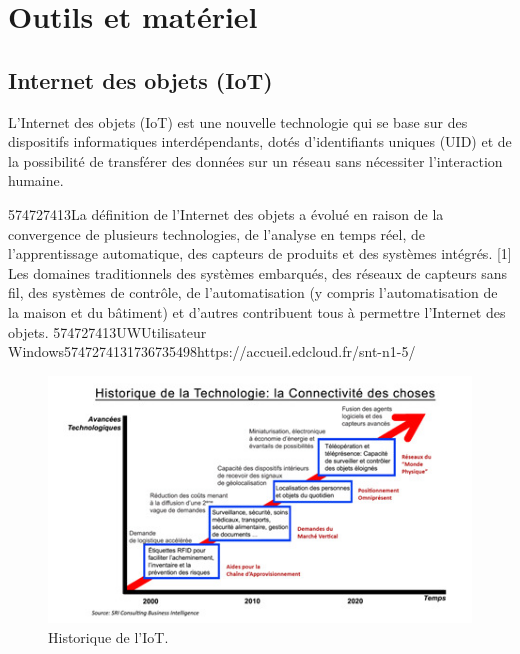 \documentclass[12pt,a4paper]{report}
\begin{document}
\chapter{Outils et matériel}


\noindent \begin{flushleft}
	
	
	\noindent 
	
	\noindent 
	
	\noindent 
	
	\section{Internet des objets (IoT)}
	
	\noindent 
	
	\noindent L'Internet des objets (IoT) est une nouvelle technologie qui se base sur des dispositifs informatiques interd\'{e}pendants, dot\'{e}s d'identifiants uniques (UID) et de la possibilit\'{e} de transf\'{e}rer des donn\'{e}es sur un r\'{e}seau sans n\'{e}cessiter l'interaction humaine.
	
	\noindent 
	
	\noindent 574727413La d\'{e}finition de l'Internet des objets a \'{e}volu\'{e} en raison de la convergence de plusieurs technologies, de l'analyse en temps r\'{e}el, de l'apprentissage automatique, des capteurs de produits et des syst\`{e}mes int\'{e}gr\'{e}s. [1] Les domaines traditionnels des syst\`{e}mes embarqu\'{e}s, des r\'{e}seaux de capteurs sans fil, des syst\`{e}mes de contr\^{o}le, de l'automatisation (y compris l'automatisation de la maison et du b\^{a}timent) et d'autres contribuent tous \`{a} permettre l'Internet des objets. 574727413UWUtilisateur Windows5747274131736735498https://accueil.edcloud.fr/snt-n1-5/
	
	\noindent 
	
	\noindent 
		\begin{figure}[H]
		\centering
		\includegraphics[width=0.8\linewidth]{image31}
		\caption{Historique de l'IoT.}
		

\end{figure}
\end{flushleft}
\end{document}
